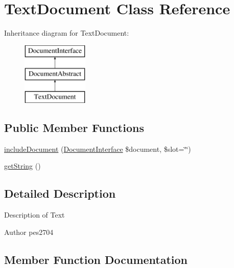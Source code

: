 \hypertarget{class_pes_1_1_document_1_1_text_document}{}\section{Text\+Document Class Reference}
\label{class_pes_1_1_document_1_1_text_document}
Inheritance diagram for Text\+Document\+:\begin{figure}[H]
\begin{center}
\leavevmode
\includegraphics[height=3.000000cm]{class_pes_1_1_document_1_1_text_document}
\end{center}
\end{figure}
\subsection*{Public Member Functions}
\begin{DoxyCompactItemize}
\item 
\mbox{\hyperlink{class_pes_1_1_document_1_1_text_document_a592ad8a112f31881ddecaa56a236cfc2}{include\+Document}} (\mbox{\hyperlink{interface_pes_1_1_document_1_1_document_interface}{Document\+Interface}} \$document, \$slot=\char`\"{}\char`\"{})
\item 
\mbox{\hyperlink{class_pes_1_1_document_1_1_text_document_afde980915cc78c408e6ac75b662e631c}{get\+String}} ()
\end{DoxyCompactItemize}


\subsection{Detailed Description}
Description of Text

\begin{DoxyAuthor}{Author}
pes2704 
\end{DoxyAuthor}


\subsection{Member Function Documentation}
\mbox{\label{class_pes_1_1_document_1_1_text_document_afde980915cc78c408e6ac75b662e631c}} 
